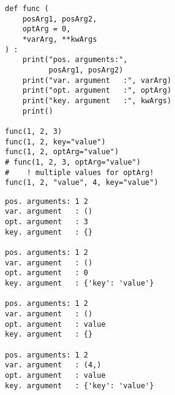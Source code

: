 \begin{frame}[fragile]
%
\begin{tcbraster}[raster columns=2,
                  raster equal height,
                  nobeforeafter,
                  raster column skip=0.5cm]
\begin{codebox}
\begin{verbatim}
def func (
    posArg1, posArg2,
    optArg = 0,
    *varArg, **kwArgs
) :
    print("pos. arguments:",
          posArg1, posArg2)
    print("var. argument   :", varArg)
    print("opt. argument   :", optArg)
    print("key. argument   :", kwArgs)
    print()

func(1, 2, 3)
func(1, 2, key="value")
func(1, 2, optArg="value")
# func(1, 2, 3, optArg="value")
#    ! multiple values for optArg!
func(1, 2, "value", 4, key="value")
\end{verbatim}
\end{codebox}
%
\begin{cmdbox}
\begin{verbatim}
pos. arguments: 1 2
var. argument   : ()
opt. argument   : 3
key. argument   : {}

pos. arguments: 1 2
var. argument   : ()
opt. argument   : 0
key. argument   : {'key': 'value'}

pos. arguments: 1 2
var. argument   : ()
opt. argument   : value
key. argument   : {}

pos. arguments: 1 2
var. argument   : (4,)
opt. argument   : value
key. argument   : {'key': 'value'}
\end{verbatim}
\end{cmdbox}
\end{tcbraster}
%
\end{frame}


